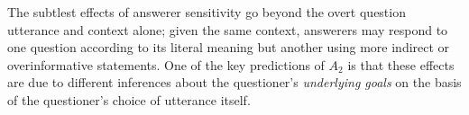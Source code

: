\documentclass[11pt, floatsintext]{apa6}
\begin{document}

The subtlest effects of answerer sensitivity go beyond the overt question utterance and context alone; given the same context, answerers may respond to one question according to its literal meaning but another using more indirect or overinformative statements. One of the key predictions of  $A_2$ is that these effects are due to different inferences about the questioner's \emph{underlying goals} on the basis of the questioner's choice of utterance itself. 
\end{document}

